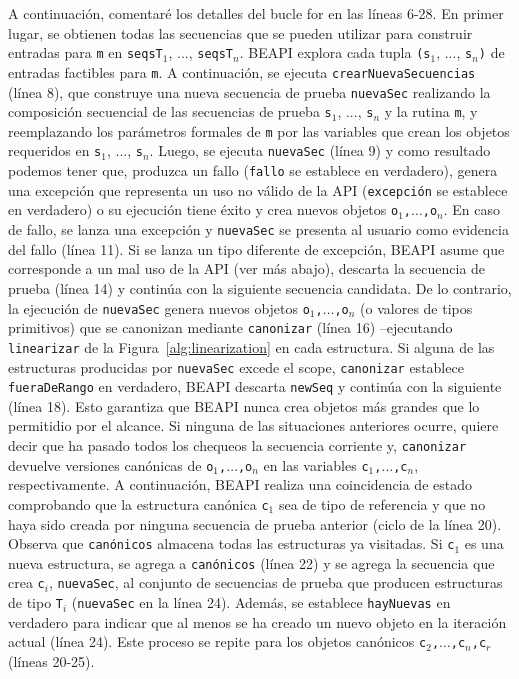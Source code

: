 
A continuación, comentaré los detalles del bucle for en las líneas 6-28. 
En primer lugar, se obtienen todas las secuencias que se pueden utilizar para construir entradas para \texttt{m} en \texttt{seqsT$_1$}, ..., \texttt{seqsT$_n$}. \textsf{BEAPI} explora cada tupla \texttt{(s$_1$}, ..., \texttt{s$_n$)} de entradas factibles para \texttt{m}.
A continuación, se ejecuta \texttt{crearNuevaSecuencias} (línea 8), que construye una nueva secuencia de prueba \texttt{nuevaSec} realizando la composición secuencial de las secuencias de prueba \texttt{s$_1$}, ..., \texttt{s$_n$} y la rutina \texttt{m}, 
y reemplazando los parámetros formales de \texttt{m} por las variables que crean los objetos requeridos en \texttt{s$_1$}, ..., \texttt{s$_n$}. 
Luego, se ejecuta \texttt{nuevaSec} (línea 9) y como resultado podemos tener que, produzca un fallo (\texttt{fallo} se establece en verdadero), genera una excepción que representa un uso no válido de la API (\texttt{excepci\'on} se establece en verdadero) 
o su ejecución tiene éxito y crea nuevos objetos \texttt{o$_1$,$\ldots$,o$_n$}. 
En caso de fallo, se lanza una excepción y \texttt{nuevaSec} se presenta al usuario como evidencia del fallo (línea 11). 
Si se lanza un tipo diferente de excepción, \textsf{BEAPI} asume que corresponde a un mal uso de la API (ver más abajo), descarta la secuencia de prueba (línea 14) y continúa con la siguiente secuencia candidata. 
De lo contrario, la ejecución de \texttt{nuevaSec} genera nuevos objetos \texttt{o$_1$,$\ldots$,o$_n$} (o valores de tipos primitivos) 
que se canonizan mediante \texttt{canonizar} (línea 16) --ejecutando \texttt{linearizar} de la Figura~\ref{alg:linearization} en cada estructura. 
Si alguna de las estructuras producidas por \texttt{nuevaSec} excede el scope, \texttt{canonizar} establece \texttt{fueraDeRango} en verdadero, \textsf{BEAPI} descarta \texttt{newSeq} 
y continúa con la siguiente (línea 18).
Esto garantiza que \textsf{BEAPI} nunca crea objetos más grandes que lo permitidio por el alcance.
Si ninguna de las situaciones anteriores ocurre, quiere decir que ha pasado todos los chequeos la secuencia corriente y, 
\texttt{canonizar} devuelve versiones canónicas de \texttt{o$_1$,$\ldots$,o$_n$} en las variables \texttt{c$_1$,$\ldots$,c$_n$}, respectivamente. 
A continuación, \textsf{BEAPI} realiza una coincidencia de estado comprobando que la estructura canónica \texttt{c$_1$} sea de tipo de referencia 
y que no haya sido creada por ninguna secuencia de prueba anterior (ciclo de la línea 20). 
Observa que \texttt{canónicos} almacena todas las estructuras ya visitadas. 
Si \texttt{c$_1$} es una nueva estructura, se agrega a \texttt{canónicos} (línea 22) y se agrega la secuencia que crea \texttt{c$_i$}, 
\texttt{nuevaSec}, al conjunto de secuencias de prueba que producen estructuras de tipo \texttt{T$_i$} (\texttt{nuevaSec} en la línea 24).
Además, se establece \texttt{hayNuevas} en verdadero para indicar que al menos se ha creado un nuevo objeto en la iteración actual (línea 24). 
Este proceso se repite para los objetos canónicos \texttt{c$_2$,$\ldots$,c$_n$,c$_r$} (líneas 20-25).


